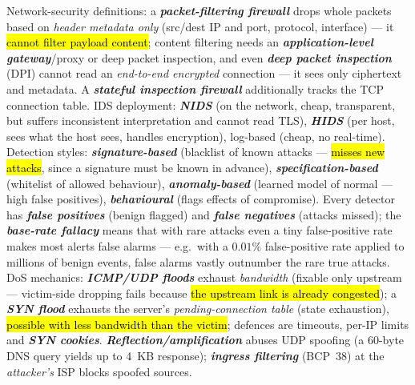 \documentclass[12pt, a4paper]{article}
\newcommand{\term}[1]{\textbf{\textit{#1}}}        %
\newcommand{\imp}[1]{\hl{#1}}                       %
\begin{document}
Network-security definitions: a \term{packet-filtering firewall} drops whole packets based on \emph{header metadata only} (src/dest IP and port, protocol, interface) --- it \imp{cannot filter payload content}; content filtering needs an \term{application-level gateway}/proxy or deep packet inspection, and even \term{deep packet inspection} (DPI) cannot read an \emph{end-to-end encrypted} connection --- it sees only ciphertext and metadata. A \term{stateful inspection firewall} additionally tracks the TCP connection table. IDS deployment: \term{NIDS} (on the network, cheap, transparent, but suffers inconsistent interpretation and cannot read TLS), \term{HIDS} (per host, sees what the host sees, handles encryption), log-based (cheap, no real-time). Detection styles: \term{signature-based} (blacklist of known attacks --- \imp{misses new attacks}, since a signature must be known in advance), \term{specification-based} (whitelist of allowed behaviour), \term{anomaly-based} (learned model of normal --- high false positives), \term{behavioural} (flags effects of compromise). Every detector has \term{false positives} (benign flagged) and \term{false negatives} (attacks missed); the \term{base-rate fallacy} means that with rare attacks even a tiny false-positive rate makes most alerts false alarms --- e.g.\ with a $0.01\%$ false-positive rate applied to millions of benign events, false alarms vastly outnumber the rare true attacks. DoS mechanics: \term{ICMP/UDP floods} exhaust \emph{bandwidth} (fixable only upstream --- victim-side dropping fails because \imp{the upstream link is already congested}); a \term{SYN flood} exhausts the server's \emph{pending-connection table} (state exhaustion), \imp{possible with less bandwidth than the victim}; defences are timeouts, per-IP limits and \term{SYN cookies}. \term{Reflection/amplification} abuses UDP spoofing (a 60-byte DNS query yields up to 4~KB response); \term{ingress filtering} (BCP~38) at the \emph{attacker's} ISP blocks spoofed sources.
\end{document}
